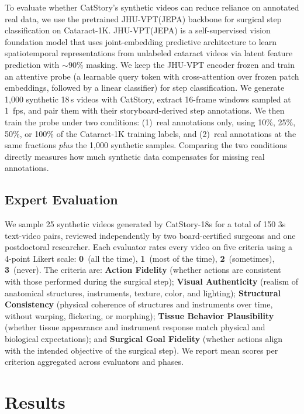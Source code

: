 \documentclass[runningheads]{llncs}
\begin{document}
To evaluate whether CatStory's synthetic videos can reduce reliance on annotated real data, we use the pretrained JHU-VPT(JEPA)\cite{shah2025vision} backbone for surgical step classification on Cataract-1K\cite{Cataract-1K}. JHU-VPT(JEPA) is a self-supervised vision foundation model that uses joint-embedding predictive architecture to learn spatiotemporal representations from unlabeled cataract videos via latent feature prediction with ${\sim}90\%$ masking. We keep the JHU-VPT encoder frozen and train an attentive probe (a learnable query token with cross-attention over frozen patch embeddings, followed by a linear classifier) for step classification. We generate 1,000 synthetic 18\,s videos with CatStory, extract 16-frame windows sampled at 1~fps, and pair them with their storyboard-derived step annotations. We then train the probe under two conditions: (1)~real annotations only, using 10\%, 25\%, 50\%, or 100\% of the Cataract-1K training labels, and (2)~real annotations at the same fractions \textit{plus} the 1,000 synthetic samples. Comparing the two conditions directly measures how much synthetic data compensates for missing real annotations.

\subsection{Expert Evaluation}
We sample 25 synthetic videos generated by CatStory-18s for a total of 150 3s text-video pairs, reviewed independently by two board-certified surgeons and one postdoctoral researcher. Each evaluator rates every video on five criteria using a 4-point Likert scale: \textbf{0}~(all the time), \textbf{1}~(most of the time), \textbf{2}~(sometimes), \textbf{3}~(never). The criteria are: \textbf{Action Fidelity} (whether actions are consistent with those performed during the surgical step); \textbf{Visual Authenticity} (realism of anatomical structures, instruments, texture, color, and lighting); \textbf{Structural Consistency} (physical coherence of structures and instruments over time, without warping, flickering, or morphing); \textbf{Tissue Behavior Plausibility} (whether tissue appearance and instrument response match physical and biological expectations); and \textbf{Surgical Goal Fidelity} (whether actions align with the intended objective of the surgical step). We report mean scores per criterion aggregated across evaluators and phases.

\section{Results}
\end{document}
